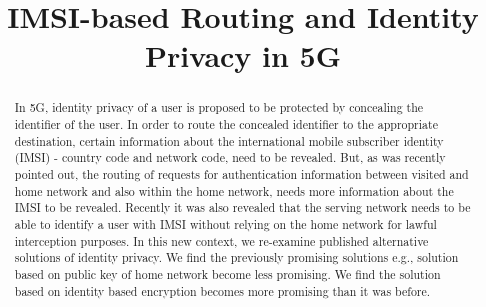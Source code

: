 \documentclass[conference]{IEEEtran}
\begin{document}
\title{IMSI-based Routing and Identity Privacy in 5G}
\date{}%

\author{
\and
{}
}
\maketitle

\begin{abstract}
In 5G, identity privacy of a user is proposed to be protected by concealing the identifier of the user. In order to route the concealed identifier to the appropriate destination, certain information about the international mobile subscriber identity (IMSI) - country code and network code, need to be revealed. But, as was recently pointed out, the routing of requests for authentication information between visited and home network and also within the home network, needs more information about the IMSI to be revealed. Recently it was also revealed that the serving network needs to be able to identify a user with IMSI without relying on the home network for lawful interception purposes. In this new context, we re-examine published alternative solutions of identity privacy. We find the previously promising solutions e.g., solution based on public key of home network become less promising. We find the solution based on identity based encryption becomes more promising than it was before.
\end{abstract}
\end{document}
